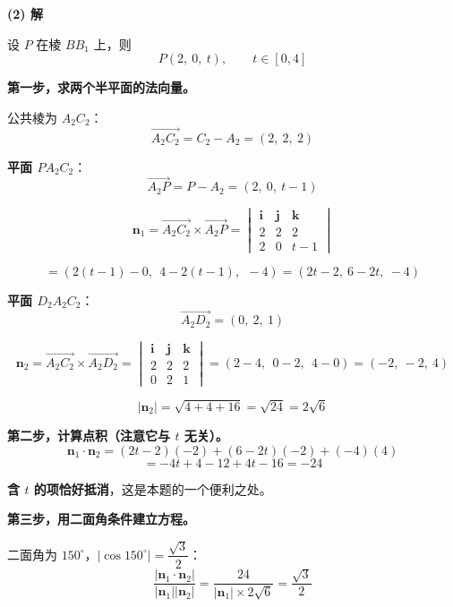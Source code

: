 \begin{answer}
\par\medskip

\textbf{(2) 解}

设 $P$ 在棱 $BB_1$ 上，则
\nopagebreak[4]
\[P(2,\ 0,\ t),\qquad t\in[0,4]\]

\textbf{第一步，求两个半平面的法向量。}

公共棱为 $A_2C_2$：
\nopagebreak[4]
\[\overrightarrow{A_2C_2}=C_2-A_2=(2,\ 2,\ 2)\]

\textbf{平面 $PA_2C_2$}：
\nopagebreak[4]
\[\overrightarrow{A_2P}=P-A_2=(2,\ 0,\ t-1)\]

\nopagebreak[4]
\[\boldsymbol n_1=\overrightarrow{A_2C_2}\times\overrightarrow{A_2P}=\begin{vmatrix}\boldsymbol i&\boldsymbol j&\boldsymbol k\\ 2&2&2\\ 2&0&t-1\end{vmatrix}\]

\nopagebreak[4]
\[=\left(2(t-1)-0,\ \ 4-2(t-1),\ \ -4\right)=\left(2t-2,\ 6-2t,\ -4\right)\]

\textbf{平面 $D_2A_2C_2$}：
\nopagebreak[4]
\[\overrightarrow{A_2D_2}=(0,\ 2,\ 1)\]

\nopagebreak[4]
\[\boldsymbol n_2=\overrightarrow{A_2C_2}\times\overrightarrow{A_2D_2}=\begin{vmatrix}\boldsymbol i&\boldsymbol j&\boldsymbol k\\ 2&2&2\\ 0&2&1\end{vmatrix}=(2-4,\ \ 0-2,\ \ 4-0)=(-2,\ -2,\ 4)\]

\nopagebreak[4]
\[\left|\boldsymbol n_2\right|=\sqrt{4+4+16}=\sqrt{24}=2\sqrt6\]

\textbf{第二步，计算点积（注意它与 $t$ 无关）。}
\nopagebreak[4]
\[\boldsymbol n_1\cdot\boldsymbol n_2=(2t-2)(-2)+(6-2t)(-2)+(-4)(4)\]
\nopagebreak[4]
\[=-4t+4-12+4t-16=-24\]

\textbf{含 $t$ 的项恰好抵消}，这是本题的一个便利之处。

\textbf{第三步，用二面角条件建立方程。}

二面角为 $150^\circ$，$\left|\cos150^\circ\right|=\dfrac{\sqrt3}2$：
\nopagebreak[4]
\[\frac{\left|\boldsymbol n_1\cdot\boldsymbol n_2\right|}{\left|\boldsymbol n_1\right|\left|\boldsymbol n_2\right|}=\frac{24}{\left|\boldsymbol n_1\right|\times2\sqrt6}=\frac{\sqrt3}2\]


\end{answer}
